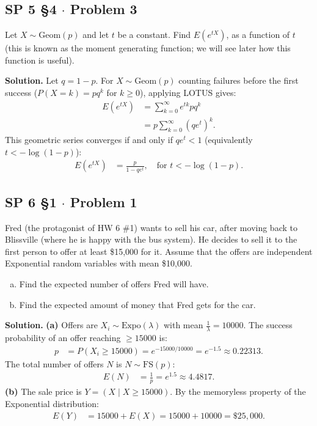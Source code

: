 \documentclass[11pt,a4paper]{article}
\begin{document}
\vspace{10pt}
\subsection{SP 5 \S4 $\cdot$ Problem 3}
\begin{tcolorbox}[title={SP 5 \S4 $\cdot$ Problem 3}]
Let $X \sim \text{Geom}(p)$ and let $t$ be a constant. Find $E(e^{tX})$, as a function of $t$ (this is known as the moment generating function; we will see later how this function is useful).
\end{tcolorbox}

\noindent \textbf{Solution.} Let $q = 1 - p$. For $X \sim \text{Geom}(p)$ counting failures before the first success ($P(X = k) = p q^k$ for $k \ge 0$), applying LOTUS gives:
\begin{align*}
E\left(e^{tX}\right) &= \sum_{k=0}^{\infty} e^{tk} p q^k \\
&= p \sum_{k=0}^{\infty} \left( q e^t \right)^k.
\end{align*}
This geometric series converges if and only if $q e^t < 1$ (equivalently $t < -\log(1 - p)$):
\begin{align*}
E\left(e^{tX}\right) &= \frac{p}{1 - q e^t}, \quad \text{for } t < -\log(1 - p).
\end{align*}

\vspace{10pt}
\subsection{SP 6 \S1 $\cdot$ Problem 1}
\begin{tcolorbox}[title={SP 6 \S1 $\cdot$ Problem 1}]
Fred (the protagonist of HW 6 \#1) wants to sell his car, after moving back to Blissville (where he is happy with the bus system). He decides to sell it to the first person to offer at least \$15,000 for it. Assume that the offers are independent Exponential random variables with mean \$10,000.
\begin{enumerate}[(a)]
\item Find the expected number of offers Fred will have.
\item Find the expected amount of money that Fred gets for the car.
\end{enumerate}
\end{tcolorbox}

\noindent \textbf{Solution.} \textbf{(a)} Offers are $X_i \sim \text{Expo}(\lambda)$ with mean $\frac{1}{\lambda} = 10000$. The success probability of an offer reaching $\ge 15000$ is:
\begin{align*}
p &= P(X_i \ge 15000) = e^{-15000/10000} = e^{-1.5} \approx 0.22313.
\end{align*}
The total number of offers $N$ is $N \sim \text{FS}(p)$:
\begin{align*}
E(N) &= \frac{1}{p} = e^{1.5} \approx 4.4817.
\end{align*}
\textbf{(b)} The sale price is $Y = (X \mid X \ge 15000)$. By the memoryless property of the Exponential distribution:
\begin{align*}
E(Y) &= 15000 + E(X) = 15000 + 10000 = \$25,000.
\end{align*}
\end{document}
